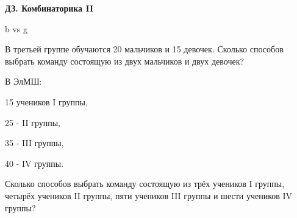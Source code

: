 \centerline{\bf \Huge ДЗ. Комбинаторика II}
\centerline{\bf \Huge }


\begin{flushright}
        \scriptsize{b vs g}
\end{flushright}


 В третьей группе обучаются 20 мальчиков и 15 девочек. Сколько способов выбрать команду состоящую из двух мальчиков и двух девочек?

 В ЭлМШ: 

15 учеников I группы, 

25 - II группы,

35 - III группы,

40 - IV группы. 

Сколько способов выбрать команду состоящую из трёх учеников I группы, четырёх учеников II группы, пяти учеников III группы и шести учеников IV группы?
